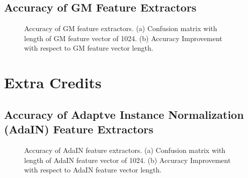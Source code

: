 \documentclass{article}
\begin{document}
\newpage
\subsection{Accuracy of GM Feature Extractors}
\begin{figure}[!htbp]
     \centering
     \captionsetup[subfigure]{labelformat=empty}
\caption{Accuracy of GM feature extractors. (a) Confusion matrix with length of GM feature vector of 1024. (b) Accuracy Improvement with respect to GM feature vector length.}
    \label{fig:GM_Results}
\end{figure}


\section{Extra Credits}
\subsection{Accuracy of Adaptve Instance Normalization (AdaIN) Feature Extractors}
\begin{figure}[!htbp]
     \centering
     \captionsetup[subfigure]{labelformat=empty}
\caption{Accuracy of AdaIN feature extractors. (a) Confusion matrix with length of AdaIN feature vector of 1024. (b) Accuracy Improvement with respect to AdaIN feature vector length.}
    \label{fig:AdaIN_Results}
\end{figure}

\newpage
\end{document}
